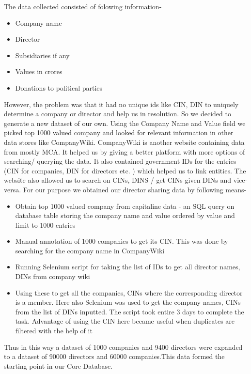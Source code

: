 The data collected consisted of folowing information-
\begin{itemize}
    \item Company name
    \item Director
    \item Subsidiaries if any
    \item Values in crores
    \item Donations to political parties
\end{itemize}

However, the problem was that it had no unique ids like CIN, DIN to uniquely determine a company or director and help us in resolution. So we decided to generate a new dataset of our own. Using the Company Name and Value field we picked top 1000 valued company and looked for relevant information in other data stores like CompanyWiki. 
CompanyWiki is another website containing data from mostly MCA. It helped us by giving a better platform with more options of searching/ querying the data. It also contained government IDs for the entries (CIN for companies, DIN for directors etc. ) which helped us to link entities. The website also allowed us to search on CINs, DINS  / get CINs given DINs and vice-versa. 
For our purpose we obtained our director sharing data by following means-

\begin{itemize}
    \item Obtain top 1000 valued company from capitaline data - an SQL query on database table storing the company name and value ordered by value and limit to 1000 entries
    \item Manual annotation of 1000 companies to get its CIN. This was done by searching for the company name in CompanyWiki
    \item Running Selenium script for taking the list of IDs to get all director names, DINs from company wiki
    \item Using these to get all the companies, CINs where the corresponding director is a member. Here also Selenium was used to get the company names, CINs from the list of DINs inputted. The script took entire 3 days to complete the task. Advantage of using the CIN here became useful when duplicates are filtered with the help of it
\end{itemize}

Thus in this way a dataset of 1000 companies and  9400 directors were expanded to a dataset of 90000 directors and 60000 companies.This data formed the starting point in our Core Database.

